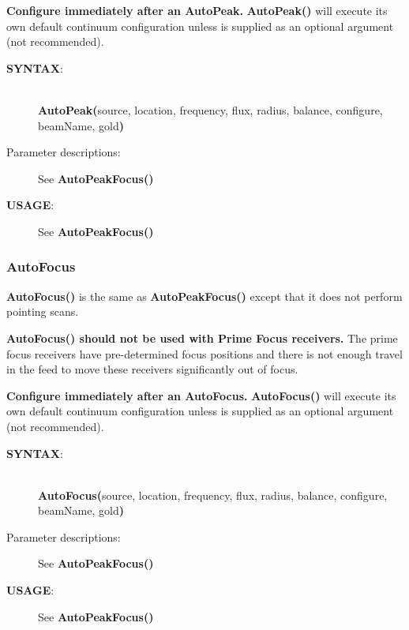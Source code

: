 {\bf Configure immediately after an AutoPeak.}
{\bfseries{\textcolor{pythonKeywords}{AutoPeak}}()}
will execute its own default continuum configuration unless
 is supplied as an optional argument (not recommended).

\begin{description}
\item[{\bf SYNTAX}:]\ \\
{\bfseries{\textcolor{pythonKeywords}{AutoPeak}}(}source, location,
frequency, flux, radius, balance, configure, beamName, gold{\bf)}
\item[Parameter descriptions:] See
{\bfseries{\textcolor{pythonKeywords}{AutoPeakFocus}}()}
\item[{\bf USAGE}:] See
{\bfseries{\textcolor{pythonKeywords}{AutoPeakFocus}}()}
\end{description}



\vspace{-0.5cm}
\subsubsection{AutoFocus}

{\bfseries{\textcolor{pythonKeywords}{AutoFocus}}()} is the same as
{\bfseries{\textcolor{pythonKeywords}{AutoPeakFocus}}()} except that it does
not perform pointing scans.

{\bf AutoFocus() should not be used with Prime Focus receivers.}
The prime focus receivers have pre-determined focus positions and there
is not enough travel in the feed to move these receivers significantly
out of focus.

{\bf Configure immediately after an AutoFocus.}
{\bfseries{\textcolor{pythonKeywords}{AutoFocus}}()}
will execute its own default continuum configuration unless
 is supplied as an optional argument (not recommended).

\begin{description}
\item[{\bf SYNTAX}:]\ \\
{\bfseries{\textcolor{pythonKeywords}{AutoFocus}}(}source, location,
frequency, flux, radius, balance, configure, beamName, gold{\bf)}
\item[Parameter descriptions:] See 
{\bfseries{\textcolor{pythonKeywords}{AutoPeakFocus}}()}
\item[{\bf USAGE}:] See
{\bfseries{\textcolor{pythonKeywords}{AutoPeakFocus}}()}
\end{description}


